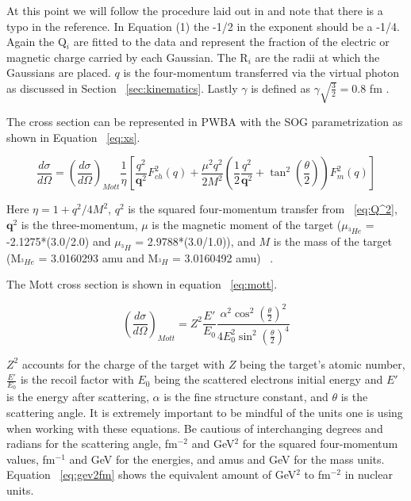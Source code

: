 \noindent At this point we will follow the procedure laid out in \cite{Article:Amroun} and note that there is a typo in the reference. In \cite{Article:Amroun} Equation (1) the -1/2 in the exponent should be a -1/4. Again the Q$_i$ are fitted to the data and represent the fraction of the electric or magnetic charge carried by each Gaussian. The R$_i$ are the radii at which the Gaussians are placed. $q$ is the four-momentum transferred via the virtual photon as discussed in Section ~\ref{sec:kinematics}. Lastly $\gamma$ is defined as $\gamma \sqrt{\frac{3}{2}}=0.8$ fm \cite{Article:Amroun}. 

The cross section can be represented in PWBA with the SOG parametrization as shown in Equation ~\ref{eq:xs}.

\begin{equation} \label{eq:xs}
	\frac{d\sigma}{d\Omega} = \left( \frac{d\sigma}{d\Omega} \right)_{Mott} \frac{1}{\eta} \left[ \frac{q^2}{\boldsymbol{q}^2}F_{ch}^2(q) + \frac{\mu^2q^2}{2M^2} \left( \frac{1}{2} \frac{q^2}{\boldsymbol{q}^2} + \tan^2 \left( \frac{\theta}{2} \right) \right)F_{m}^2(q) \right]
\end{equation}

\noindent Here $\eta = 1 + q^2/4M^2$, $q^2$ is the squared four-momentum transfer from ~\ref{eq:Q^2}, $\boldsymbol{q}^2$ is the three-momentum, $\mu$ is the magnetic moment of the target ($\mu_{^3He}$ = -2.1275*(3.0/2.0) and $\mu_{^3H}$ = 2.9788*(3.0/1.0)), and $M$ is the mass of the target (M$_{^3He}$ = 3.0160293 amu and M$_{^3H}$ = 3.0160492 amu) ~\cite{Article:Amroun}. 

The Mott cross section is shown in equation ~\ref{eq:mott}.

\begin{equation} \label{eq:mott}
	\left( \frac{d\sigma}{d\Omega} \right)_{Mott} = Z^2 \frac{E'}{E_0} \frac{\alpha^2 \cos^2 \left( \frac{\theta}{2} \right)^2}{4E_0^2 \sin^2 \left( \frac{\theta}{2} \right)^4} 
\end{equation}
 
\noindent $Z^2$ accounts for the charge of the target with $Z$ being the target's atomic number, $\frac{E'}{E_0}$ is the recoil factor with $E_0$ being the scattered electrons initial energy and $E'$ is the energy after scattering, $\alpha$ is the fine structure constant, and $\theta$ is the scattering angle. It is extremely important to be mindful of the units one is using when working with these equations. Be cautious of interchanging degrees and radians for the scattering angle, fm$^{-2}$ and GeV$^2$ for the squared four-momentum values, fm$^{-1}$ and GeV for the energies, and amus and GeV for the mass units. Equation ~\ref{eq:gev2fm} shows the equivalent amount of GeV$^2$ to fm$^{-2}$ in nuclear units.


